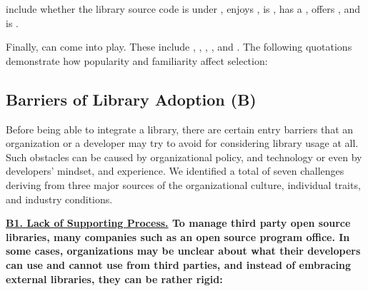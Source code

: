  include whether the library source code is under , enjoys , is , has a , offers , and is . 

Finally,  can come into play. These include , , , , and . The following quotations demonstrate how popularity and familiarity affect selection:

\subsection{Barriers of Library Adoption (B)}
Before being able to integrate a library, there are certain entry barriers that an organization or a developer may try to avoid for considering library usage at all. Such obstacles can be caused by organizational policy, and technology or even by developers' mindset, and experience. We identified a total of seven challenges deriving from three major sources of the organizational culture, individual traits, and industry conditions.

\nd\bf{\ul{B1. Lack of Supporting Process.}} To manage third party open source libraries, many companies  such as an open source program office. In some cases, organizations may be unclear about what their developers can use and cannot use from third parties, and instead of embracing external libraries, they can be rather rigid:  

